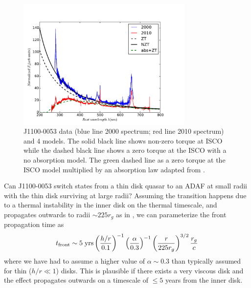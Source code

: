 \documentclass[a4paper,fleqn,usenatbib]{mnras}
\begin{document}
{\begin{figure}
  \centering
\includegraphics[width=8.7cm, trim=0.2cm 0.2cm 1.4cm 0.6cm, clip]
{../plots/models/mcd_gap_v3_3_b1.pdf}
\vspace{-12pt}
  \caption[]{
J1100-0053 data (blue line 2000 spectrum; red line 2010 spectrum) and
4 models. The solid black line shows non-zero torque at ISCO
\citep[following] []{Afshordi_Paczynski2003} while the
dashed black line shows a zero torque at the ISCO with a no absorption model. 
The green dashed line as a zero torque at the ISCO model multiplied by an 
absorption law adapted from \citep{Guo2016}.   }
  \label{fig:disk_suppression}
\end{figure}
Can J1100-0053 switch states from a thin disk quasar to an ADAF at
small radii with the thin disk surviving at large radii?
Assuming the transition happens due to a thermal instability in the
inner disk on the thermal timescale, and propagates outwards to radii
$\sim 225r_{g}$ as in \citet{Nemmen2006}, we can parameterize the
front propagation time as
\begin{equation}
    t_{\rm front}  \sim  5 \; {\rm yrs} \left(\frac{h/r}{0.1}\right)^{-1}
                                                           \left(\frac{\alpha}{0.3}\right)^{-1}  
                                                           \left(\frac{r}{225r_{g}}\right)^{3/2}  
                                                           \frac{r_{g}}{c}
\label{eqn:t_front}
\end{equation}
where we have had to assume a higher value of $\alpha \sim 0.3$
\citep{King2007} than typically assumed for thin ($h/r \ll 1$)
disks. This is plausible if there exists a very viscous disk and the
effect propagates outwards on a timescale of $\leq 5$ years from the
inner disk.

}
\end{document}
